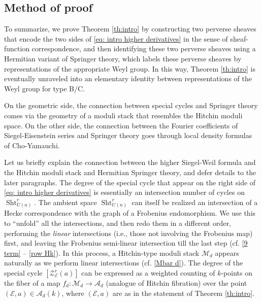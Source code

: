 \documentclass[reqno]{amsart}
\numberwithin{equation}{section}
\newcommand{\Z}{\mathbf{Z}}
\DeclareMathOperator{\Sht}{Sht}
\DeclareMathOperator{\Herm}{Herm}
\newcommand\cA{\mathcal{A}}
\newcommand\cE{\mathcal{E}}
\newcommand\cM{\mathcal{M}}
\newcommand\cZ{\mathcal{Z}}
\theoremstyle{remark}
\numberwithin{equation}{section}
\begin{document}
\subsection{Method of proof}\label{ssec: overview of proof} To summarize, we prove Theorem \ref{th:intro} by constructing two perverse sheaves that encode the two sides of \eqref{eq: intro higher derivatives} in the sense of sheaf-function correspondence, and then identifying these two perverse sheaves using a Hermitian variant of Springer theory, which labels these perverse sheaves by representations of the appropriate Weyl group. In this way, Theorem \ref{th:intro} is eventually unraveled into an elementary identity between representations of the Weyl group for type B/C.




On the geometric side, the connection between special cycles and Springer theory comes via the geometry of a moduli stack that resembles the Hitchin moduli space. On the other side, the connection between the Fourier coefficients of Siegel-Eisenstein series and Springer theory goes through local density formulas of Cho-Yamauchi.

Let us briefly explain the connection between the higher Siegel-Weil formula and the Hitchin moduli stack and Hermitian Springer theory, and defer details to the later paragraphs.  The degree of the special cycle that appear on the right side of \eqref{eq: intro higher derivatives} is essentially an intersection number of cycles on $\Sht^{r}_{U(n)}$. The ambient space $\Sht^{r}_{U(n)}$ can itself be realized an intersection of a Hecke correspondence with the graph of a Frobenius endomorphism. We use this to ``unfold'' all the intersections, and then redo them in a different order, performing the \emph{linear} intersections (i.e., those not involving the Frobenius map) first, and leaving the Frobenius semi-linear intersection till the last step (cf. \eqref{9 term} --  \eqref{row Hk}). In this process, a Hitchin-type moduli stack $\cM_{d}$ appears naturally as we perform linear intersections (cf. \eqref{Mbar d}). The degree of the special cycle $[\cZ^{r}_{\cE}(a)]$ can be expressed as a weighted counting of $k$-points on the fiber of a map $f_{d}: \cM_{d}\to \cA_{d}$ (analogue of Hitchin fibration) over the point $(\cE,a)\in \cA_d(k)$, where $(\cE,a)$ are as in the statement of Theorem \ref{th:intro}. 
\end{document}
